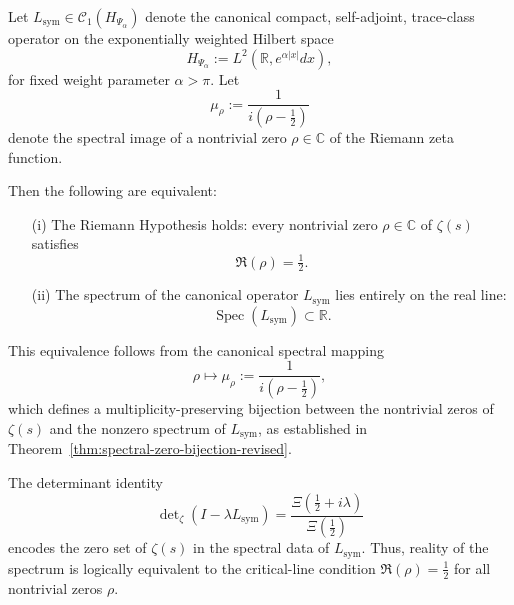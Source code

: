 \begin{theorem}
\label{thm:rh-spectrum-equiv}
Let \( L_{\mathrm{sym}} \in \mathcal{C}_1(H_{\Psi_\alpha}) \) denote the canonical compact, self-adjoint, trace-class operator on the exponentially weighted Hilbert space
\[
H_{\Psi_\alpha} := L^2(\mathbb{R}, e^{\alpha |x|} dx),
\]
for fixed weight parameter \( \alpha > \pi \). Let
\[
\mu_\rho := \frac{1}{i(\rho - \tfrac{1}{2})}
\]
denote the spectral image of a nontrivial zero \( \rho \in \mathbb{C} \) of the Riemann zeta function.

Then the following are equivalent:
\begin{enumerate}
  \item[\textup{(i)}] The Riemann Hypothesis holds: every nontrivial zero \( \rho \in \mathbb{C} \) of \( \zeta(s) \) satisfies
  \[
  \Re(\rho) = \tfrac{1}{2}.
  \]

  \item[\textup{(ii)}] The spectrum of the canonical operator \( L_{\mathrm{sym}} \) lies entirely on the real line:
  \[
  \operatorname{Spec}(L_{\mathrm{sym}}) \subset \mathbb{R}.
  \]
\end{enumerate}

\medskip
\noindent
This equivalence follows from the canonical spectral mapping
\[
\rho \mapsto \mu_\rho := \frac{1}{i(\rho - \tfrac{1}{2})},
\]
which defines a multiplicity-preserving bijection between the nontrivial zeros of \( \zeta(s) \) and the nonzero spectrum of \( L_{\mathrm{sym}} \), as established in Theorem~\ref{thm:spectral-zero-bijection-revised}.

The determinant identity
\[
\det\nolimits_\zeta(I - \lambda L_{\mathrm{sym}}) = \frac{\Xi\left( \tfrac{1}{2} + i\lambda \right)}{\Xi\left( \tfrac{1}{2} \right)}
\]
encodes the zero set of \( \zeta(s) \) in the spectral data of \( L_{\mathrm{sym}} \). Thus, reality of the spectrum is logically equivalent to the critical-line condition \( \Re(\rho) = \tfrac{1}{2} \) for all nontrivial zeros \( \rho \).
\end{theorem}
